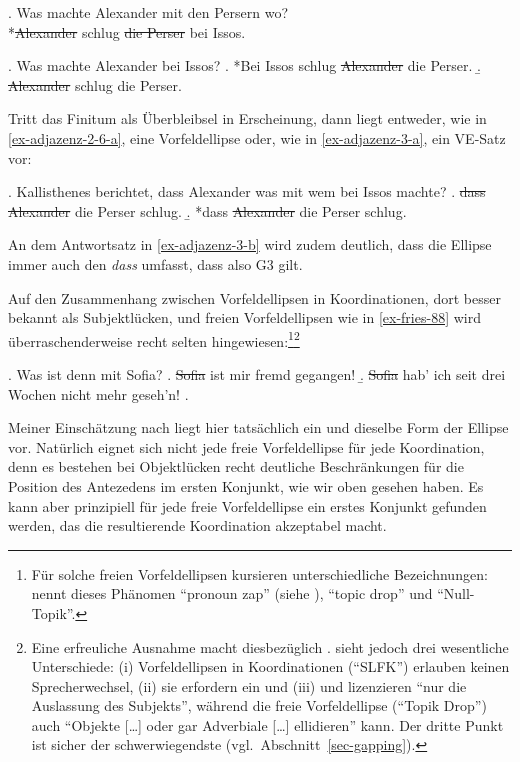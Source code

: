 \ex. \label{ex-adjazenz-2-8} Was machte Alexander mit den Persern wo? \\
*\sout{Alexander} schlug \sout{die Perser}  bei Issos.

\ex. \label{ex-adjazenz-2-6} Was machte Alexander bei Issos? 
\a.  *Bei Issos schlug \sout{Alexander} die Perser.\label{ex-adjazenz-2-6-b}
\b.  \sout{Alexander} schlug die Perser.\label{ex-adjazenz-2-6-a}

Tritt das Finitum als Überbleibsel in Erscheinung, dann liegt entweder, wie in \ref{ex-adjazenz-2-6-a}, eine Vorfeldellipse oder, wie in  \ref{ex-adjazenz-3-a}, ein VE-Satz vor:

\ex. \label{ex-adjazenz-3}Kallisthenes berichtet, dass Alexander was mit wem bei Issos machte?
\a. \sout{dass Alexander} die Perser schlug.\label{ex-adjazenz-3-a}
\b. *dass \sout{Alexander} die Perser schlug.\label{ex-adjazenz-3-b}

An dem Antwortsatz in \ref{ex-adjazenz-3-b} wird zudem deutlich, dass die Ellipse immer auch den  {\it dass} umfasst, dass also G3 gilt.

Auf den Zusammenhang zwischen Vorfeldellipsen in Koordinationen, dort besser bekannt als Subjektlücken, und freien Vorfeldellipsen wie in \ref{ex-fries-88} wird überraschenderweise recht selten hingewiesen:\footnote{Für solche freien Vorfeldellipsen kursieren unterschiedliche Bezeichnungen: \cite{Ross:82} nennt dieses Phänomen "`pronoun zap"' (siehe \citealt{Huang:84}), \cite{Oirsouw:87} "`topic drop"' und \cite{Fries:88} "`Null-Topik"'.}\footnote{Eine erfreuliche Ausnahme macht diesbezüglich \citet[136ff]{Oirsouw:87}. \citet[153]{Reich:09} sieht jedoch drei wesentliche Unterschiede: (i) Vorfeldellipsen in Koordinationen ("`SLFK"') erlauben keinen Sprecherwechsel, (ii) sie erfordern ein  und (iii) und lizenzieren "`nur die Auslassung des Subjekts"', während die freie Vorfeldellipse ("`Topik Drop"') auch "`Objekte [\ldots] oder gar Adverbiale [\ldots] ellidieren"' kann. Der dritte Punkt ist sicher der schwerwiegendste (vgl.\ Abschnitt~\ref{sec-gapping}).}  

\ex. \label{ex-fries-88}Was ist denn mit Sofia?
\a. \sout{Sofia} ist mir fremd gegangen!
\b. \sout{Sofia} hab' ich seit drei Wochen nicht mehr geseh'n!
\z. \citep[(1)--(3)]{Fries:88} 

Meiner Einschätzung nach liegt hier tatsächlich ein und dieselbe Form der Ellipse vor. Natürlich eignet sich nicht jede freie Vorfeldellipse für jede Koordination, denn es bestehen bei Objektlücken recht deutliche Beschränkungen für die Position des  Antezedens im ersten Konjunkt, wie wir oben gesehen haben. Es kann aber prinzipiell für jede freie Vorfeldellipse ein erstes Konjunkt gefunden werden, das die resultierende Koordination akzeptabel macht.  


